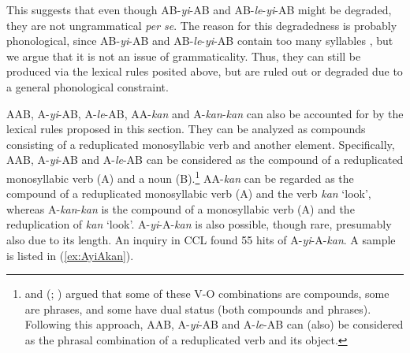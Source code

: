 This suggests that  even though AB-\textit{yi}-AB and AB-\textit{le}-\textit{yi}-AB might be degraded, they are not ungrammatical \textit{per se}.
The reason for this degradedness is probably phonological, since AB-\textit{yi}-AB and AB-\textit{le}-\textit{yi}-AB contain too many syllables \citetext{\citealp[274]{Fan1964}; \citealp[15]{Zhang2000}; \citealp[239]{YangWei2017}; \citealp[143]{Sui2018}}, but we argue that it is not an issue of grammaticality.
Thus, they can still be produced via the lexical rules posited above, but are ruled out or degraded due to a general phonological constraint.


AAB, A-\textit{yi}-AB, A-\textit{le}-AB, AA-\textit{kan} and A-\textit{kan}-\textit{kan} can also be accounted for by the lexical rules proposed in this section.
They can be analyzed as compounds consisting of a reduplicated monosyllabic verb and another element.
Specifically, AAB, A-\textit{yi}-AB and A-\textit{le}-AB can be considered as the compound of a reduplicated monosyllabic verb (A) and a noun (B).\footnote{
    \citet[64--65]{Huang1984} and \citeauthor{Her1996} (\citeyear[Sec. 2]{Her1996}; \citeyear[Sec. 3.1]{Her2010}) argued that some of these V-O combinations are compounds, some are phrases, and some have dual status (both compounds and phrases).
    Following this approach, AAB, A-\textit{yi}-AB and A-\textit{le}-AB can (also) be considered as the phrasal combination of a reduplicated verb and its object.
}
AA-\textit{kan} can be regarded as the compound of a reduplicated monosyllabic verb (A) and the verb \textit{kan} `look',
whereas A-\textit{kan}-\textit{kan} is the compound of a monosyllabic verb (A) and the reduplication of \textit{kan} `look'.
A-\textit{yi}-A-\textit{kan} is also possible, though rare, presumably also due to its length.
An inquiry in CCL found 55 hits of A-\textit{yi}-A-\textit{kan}.
A sample is listed in (\ref{ex:AyiAkan}).

